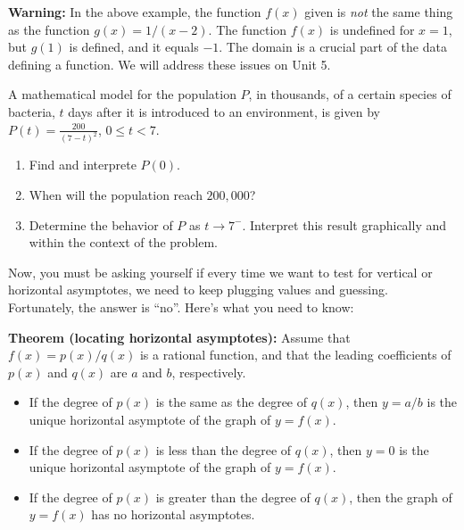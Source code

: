 \documentclass{ximera}
\begin{document}
\begin{example}
\begin{enumerate}

  \begin{callout}
    {\bf Warning:} In the above example, the function $f(x)$ given is \emph{not} the same thing as the function $g(x) = 1/(x-2)$. The function $f(x)$ is undefined for $x=1$, but $g(1)$ is defined, and it equals $-1$. The domain is a crucial part of the data defining a function. We will address these issues on Unit 5.
  \end{callout}
  \end{enumerate}
\end{example}


\begin{exploration}
  A mathematical model for the population $P$, in thousands, of a certain species of bacteria, $t$ days after it is introduced to an environment, is given by $P(t) = \frac{200}{(7-t)^2}$, $0 \leq t < 7$.
  \begin{enumerate}
  \item Find and interprete $P(0)$.
  \item When will the population reach $200,000$?
  \item Determine the behavior of $P$ as $t \to 7^-$. Interpret this result graphically and within the context of the problem.
  \end{enumerate}
\end{exploration}

Now, you must be asking yourself if every time we want to test for vertical or horizontal asymptotes, we need to keep plugging values and guessing. Fortunately, the answer is ``no''. Here's what you need to know:

\begin{callout}
  {\bf Theorem (locating horizontal asymptotes):} Assume that $f(x) = p(x)/q(x)$ is a rational function, and that the leading coefficients of $p(x)$ and $q(x)$ are $a$ and $b$, respectively.
  \begin{itemize}
  \item If the degree of $p(x)$ is the same as the degree of $q(x)$, then $y=a/b$ is the unique horizontal asymptote of the graph of $y=f(x)$.
  \item If the degree of $p(x)$ is less than the degree of $q(x)$, then $y=0$ is the unique horizontal asymptote of the graph of $y=f(x)$.
  \item If the degree of $p(x)$ is greater than the degree of $q(x)$, then the graph of $y=f(x)$ has no horizontal asymptotes.
  \end{itemize}
\end{callout}
\end{document}
